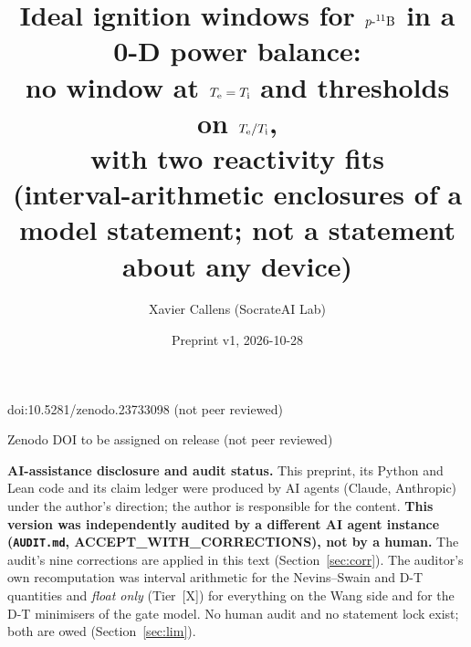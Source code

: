 \documentclass[10pt]{article}
\title{Ideal ignition windows for $p\text{-}{}^{11}\mathrm{B}$ in a 0-D power balance:\\
no window at $T_{\mathrm e}=T_{\mathrm i}$ and thresholds on $T_{\mathrm e}/T_{\mathrm i}$,\\ with two reactivity fits\\
{\large (interval-arithmetic enclosures of a model statement; not a statement about any device)}}
\author{Xavier Callens (SocrateAI Lab)}
\date{Preprint v1, 2026-10-28}
\newcommand{\tier}[1]{\textsf{[#1]}}
\newcommand{\tX}{\tier{X}}
\begin{document}
\maketitle
\begin{center}\small doi:10.5281/zenodo.23733098 \quad (not peer reviewed)\end{center}

\begin{center}\small Zenodo DOI to be assigned on release \quad (not peer reviewed)\end{center}

\noindent\textbf{AI-assistance disclosure and audit status.} This preprint, its Python and Lean code and its claim ledger were
produced by AI agents (Claude, Anthropic) under the author's direction; the author is responsible for the content.
\textbf{This version was independently audited by a different AI agent instance (\texttt{AUDIT.md}, ACCEPT\_WITH\_CORRECTIONS), not by a human.}
The audit's nine corrections are applied in this text (Section~\ref{sec:corr}). The auditor's own recomputation was interval arithmetic for the Nevins--Swain and D-T quantities and \emph{float only} (Tier~\tX{}) for everything on the Wang side and for the D-T minimisers of the gate model. No human audit and no statement lock exist; both are owed (Section~\ref{sec:lim}).
\end{document}
